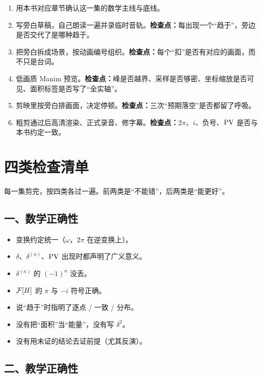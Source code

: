 \begin{enumerate}[leftmargin=2em,itemsep=0.5em]
\item 用本书对应章节确认这一集的数学主线与底线。
\item 写旁白草稿，自己朗读一遍并录临时音轨。\textbf{检查点：}每出现一个“趋于”，旁边是否交代了是哪种趋于。
\item 把旁白拆成场景，按动画编号组织。\textbf{检查点：}每个“扣”是否有对应的画面，而不只是台词。
\item 低画质 Manim 预览。\textbf{检查点：}峰是否越界、采样是否够密、坐标缩放是否可见、面积标签是否写了“全实轴”。
\item 剪映里按旁白排画面，决定停顿。\textbf{检查点：}三次“预期落空”是否都留了呼吸。
\item 粗剪通过后高清渲染、正式录音、修字幕。\textbf{检查点：}$2\pi$、$i$、负号、$\operatorname{PV}$ 是否与本书约定一致。
\end{enumerate}

\section{四类检查清单}

每一集剪完，按四类各过一遍。前两类是“不能错”，后两类是“能更好”。

\subsection*{一、数学正确性}

\begin{itemize}[leftmargin=1.6em,itemsep=0.25em]
\item[$\square$] 变换约定统一（$\omega$，$2\pi$ 在逆变换上）。
\item[$\square$] $\delta$、$\delta^{(n)}$、$\operatorname{PV}$ 出现时都声明了广义意义。
\item[$\square$] $\delta^{(n)}$ 的 $(-1)^{n}$ 没丢。
\item[$\square$] $\mathcal{F}[H]$ 的 $\pi$ 与 $-i$ 符号正确。
\item[$\square$] 说“趋于”时指明了逐点 / 一致 / 分布。
\item[$\square$] 没有把“面积”当“能量”，没有写 $\delta^{2}$。
\item[$\square$] 没有用未证的结论去证前提（尤其反演）。
\end{itemize}

\subsection*{二、教学正确性}

